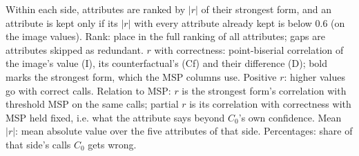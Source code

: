 \begin{table}[htbp]
\begin{threeparttable}
\begin{tablenotes}\footnotesize
\item Within each side, attributes are ranked by $|r|$ of their strongest form, and an attribute is kept only if its $|r|$ with every attribute already kept is below $0.6$ (on the image values). Rank: place in the full ranking of all attributes; gaps are attributes skipped as redundant. $r$ with correctness: point-biserial correlation of the image's value (I), its counterfactual's (Cf) and their difference (D); bold marks the strongest form, which the MSP columns use. Positive $r$: higher values go with correct calls. Relation to MSP: $r$ is the strongest form's correlation with threshold MSP on the same calls; partial $r$ is its correlation with correctness with MSP held fixed, i.e. what the attribute says beyond $C_0$'s own confidence. Mean $|r|$: mean absolute value over the five attributes of that side. Percentages: share of that side's calls $C_0$ gets wrong.
\end{tablenotes}
\end{threeparttable}
\end{table}
